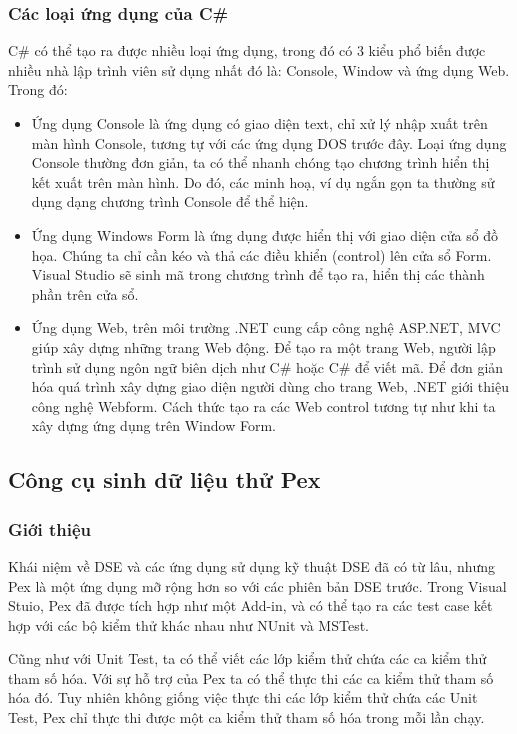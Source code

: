 \subsubsection*{Các loại ứng dụng của C\#}
C\# có thể tạo ra được nhiều loại ứng dụng, trong đó có 3 kiểu phổ biến được nhiều nhà lập trình viên sử dụng nhất đó là: Console, Window và ứng dụng Web. Trong đó:
\begin{itemize}
	\item Ứng dụng Console là ứng dụng có giao diện text, chỉ xử lý nhập xuất trên màn hình Console, tương tự với các ứng dụng DOS trước đây. Loại ứng dụng Console thường đơn giản, ta có thể nhanh chóng tạo chương trình hiển thị kết xuất trên màn hình. Do đó, các minh hoạ, ví dụ ngắn gọn ta thường sử dụng dạng chương trình Console để thể hiện.
	\item Ứng dụng Windows Form là ứng dụng được hiển thị với giao diện cửa sổ đồ họa. Chúng ta chỉ cần kéo và thả các điều khiển (control) lên cửa sổ Form. Visual Studio sẽ sinh mã trong chương trình để tạo ra, hiển thị các thành phần trên cửa sổ.
	\item Ứng dụng Web, trên môi trường .NET cung cấp công nghệ ASP.NET, MVC giúp xây dựng những trang Web động. Để tạo ra một trang Web, người lập trình sử dụng ngôn ngữ biên dịch như C\# hoặc C\# để viết mã. Để đơn giản hóa quá trình xây dựng giao diện người dùng cho trang Web, .NET giới thiệu công nghệ Webform. Cách thức tạo ra các Web control tương tự như khi ta xây dựng ứng dụng trên Window Form.
\end{itemize}

\subsection{Công cụ sinh dữ liệu thử Pex}
\subsubsection*{Giới thiệu}
Khái niệm về DSE và các ứng dụng sử dụng kỹ thuật DSE đã có từ lâu, nhưng Pex là một ứng dụng mỡ rộng hơn so với các phiên bản DSE trước. Trong Visual Stuio, Pex đã được tích hợp như một Add-in, và có thể tạo ra các test case kết hợp với các bộ kiểm thử khác nhau như NUnit và MSTest. 

Cũng như với Unit Test, ta có thể viết các lớp kiểm thử chứa các ca kiểm thử tham số hóa. Với sự hỗ trợ của Pex ta có thể thực thi các ca kiểm thử tham số hóa đó. Tuy nhiên không giống việc thực thi các lớp kiểm thử chứa các Unit Test, Pex chỉ thực thi được một ca kiểm thử tham số hóa trong mỗi lần chạy.

